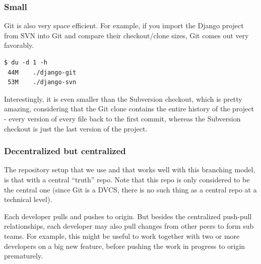 \subsubsection{Small}
Git is also very space efficient. For example, if you import the Django project
from SVN into Git and compare their checkout/clone sizes, Git comes out very
favorably.
\begin{verbatim}
$ du -d 1 -h
 44M	./django-git
 53M	./django-svn
\end{verbatim}
Interestingly, it is even smaller than the Subversion checkout, which is pretty
amazing, considering that the Git clone contains the entire history of the
project - every version of every file back to the first commit, whereas the
Subversion checkout is just the last version of the project.


\subsubsection{Decentralized but centralized}
The repository setup that we use and that works well with this branching model,
is that with a central “truth” repo. Note that this repo is only considered to be
the central one (since Git is a DVCS, there is no such thing as a central repo at
a technical level).

Each developer pulls and pushes to origin. But besides the centralized push-pull
relationships, each developer may also pull changes from other peers to form sub
teams. For example, this might be useful to work together with two or more
developers on a big new feature, before pushing the work in progress to origin
prematurely.
